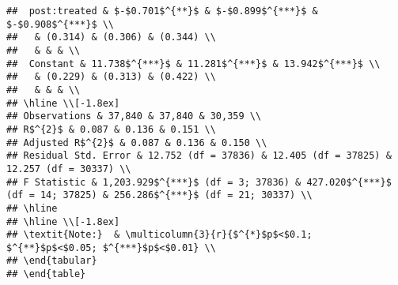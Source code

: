 \documentclass[11pt,]{article}
\begin{document}
\begin{verbatim}
##  post:treated & $-$0.701$^{**}$ & $-$0.899$^{***}$ & $-$0.908$^{***}$ \\ 
##   & (0.314) & (0.306) & (0.344) \\ 
##   & & & \\ 
##  Constant & 11.738$^{***}$ & 11.281$^{***}$ & 13.942$^{***}$ \\ 
##   & (0.229) & (0.313) & (0.422) \\ 
##   & & & \\ 
## \hline \\[-1.8ex] 
## Observations & 37,840 & 37,840 & 30,359 \\ 
## R$^{2}$ & 0.087 & 0.136 & 0.151 \\ 
## Adjusted R$^{2}$ & 0.087 & 0.136 & 0.150 \\ 
## Residual Std. Error & 12.752 (df = 37836) & 12.405 (df = 37825) & 12.257 (df = 30337) \\ 
## F Statistic & 1,203.929$^{***}$ (df = 3; 37836) & 427.020$^{***}$ (df = 14; 37825) & 256.286$^{***}$ (df = 21; 30337) \\ 
## \hline 
## \hline \\[-1.8ex] 
## \textit{Note:}  & \multicolumn{3}{r}{$^{*}$p$<$0.1; $^{**}$p$<$0.05; $^{***}$p$<$0.01} \\ 
## \end{tabular} 
## \end{table}
\end{verbatim}
\end{document}
